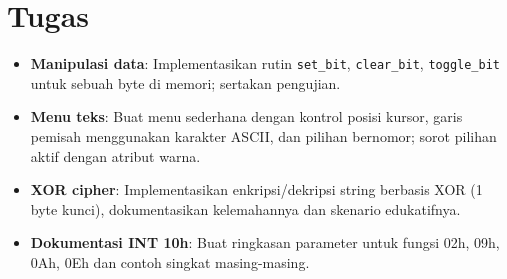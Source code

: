 \section{Tugas}
\begin{itemize}
  \item \textbf{Manipulasi data}: Implementasikan rutin \texttt{set\_bit}, \texttt{clear\_bit}, \texttt{toggle\_bit} untuk sebuah byte di memori; sertakan pengujian.
  \item \textbf{Menu teks}: Buat menu sederhana dengan kontrol posisi kursor, garis pemisah menggunakan karakter ASCII, dan pilihan bernomor; sorot pilihan aktif dengan atribut warna.
  \item \textbf{XOR cipher}: Implementasikan enkripsi/dekripsi string berbasis XOR (1 byte kunci), dokumentasikan kelemahannya dan skenario edukatifnya.
  \item \textbf{Dokumentasi INT 10h}: Buat ringkasan parameter untuk fungsi 02h, 09h, 0Ah, 0Eh dan contoh singkat masing-masing.
\end{itemize}

